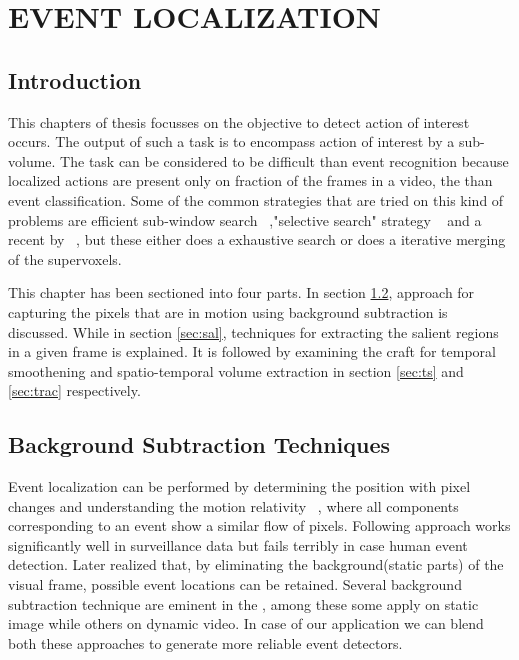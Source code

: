 \chapter{EVENT LOCALIZATION}
 \label{chap:eventLo}
\section{Introduction}
This chapters of thesis focusses on the objective to detect action of interest occurs. The output of such a task is to encompass action of interest by a sub-volume. The task can be considered to be difficult than event recognition because localized actions are present only on fraction of the frames in a video, the  than event classification. Some of the common strategies that are tried on this kind of problems are efficient sub-window search ~\citep{subwindowsearch},"selective search" strategy ~\citep{selectivesearch}  and a recent by ~\cite{tubelet}, but these either does a exhaustive search or does a iterative merging of the supervoxels. 
\par This chapter has been sectioned into four parts. In section \ref{sec:bst}, approach for capturing the pixels that are in motion using background subtraction is discussed. While in section \ref{sec:sal}, techniques for extracting the salient regions in a given frame is explained. It is followed by examining the craft for temporal smoothening and spatio-temporal volume extraction in section \ref{sec:ts} and \ref{sec:trac} respectively.

\section{Background Subtraction Techniques} 
 \label{sec:bst}
\par Event localization can be performed by determining the position with pixel changes and understanding the motion relativity ~\citep{Basharat08}, where all components corresponding to an event show a similar flow of pixels. Following approach works significantly well in surveillance data but fails terribly in case human event detection. Later realized that, by eliminating the background(static parts) of the visual frame,  possible event locations can be retained.  Several background subtraction technique are eminent in the \cite{Piccardi04}, among these some apply on static image while others on dynamic video. In case of our application we can blend both these approaches to generate more reliable event detectors.

